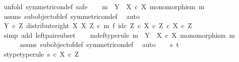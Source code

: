 \begin{isabellebody}
%
\isadelimproof
%
\endisadelimproof
%
\isatagproof
{}\isamarkupfalse%
\ {\isacharparenleft}{\kern0pt}unfold\ symmetric{\isacharunderscore}{\kern0pt}on{\isacharunderscore}{\kern0pt}def{\isacharcomma}{\kern0pt}\ safe{\isacharparenright}{\kern0pt}\isanewline
\ \ \isamarkupfalse%
\ {\isachardoublequoteopen}m\ {\isacharcolon}{\kern0pt}\ Y\ {\isasymrightarrow}\ X\ {\isasymtimes}\isactrlsub c\ X{\isachardoublequoteclose}\ {\isachardoublequoteopen}monomorphism\ m{\isachardoublequoteclose}\isanewline
\ \ \ \ \isamarkupfalse%
\ assms\ subobject{\isacharunderscore}{\kern0pt}of{\isacharunderscore}{\kern0pt}def{}\ symmetric{\isacharunderscore}{\kern0pt}on{\isacharunderscore}{\kern0pt}def\ \isamarkupfalse%
\ auto\isanewline
\ \ \isamarkupfalse%
\ \isamarkupfalse%
\ {\isachardoublequoteopen}{\isacharparenleft}{\kern0pt}Y\ {\isasymtimes}\isactrlsub c\ Z{\isacharcomma}{\kern0pt}\ distribute{\isacharunderscore}{\kern0pt}right\ X\ X\ Z\ {\isasymcirc}\isactrlsub c\ m\ {\isasymtimes}\isactrlsub f\ id\isactrlsub c\ Z{\isacharparenright}{\kern0pt}\ {\isasymsubseteq}\isactrlsub c\ {\isacharparenleft}{\kern0pt}X\ {\isasymtimes}\isactrlsub c\ Z{\isacharparenright}{\kern0pt}\ {\isasymtimes}\isactrlsub c\ X\ {\isasymtimes}\isactrlsub c\ Z{\isachardoublequoteclose}\isanewline
\ \ \ \ \isamarkupfalse%
\ {\isacharparenleft}{\kern0pt}simp\ add{\isacharcolon}{\kern0pt}\ left{\isacharunderscore}{\kern0pt}pair{\isacharunderscore}{\kern0pt}subset{\isacharparenright}{\kern0pt}\isanewline
{}\isamarkupfalse%
\isanewline
\ \ \isamarkupfalse%
\ m{\isacharunderscore}{\kern0pt}def{\isacharbrackleft}{\kern0pt}type{\isacharunderscore}{\kern0pt}rule{\isacharbrackright}{\kern0pt}{\isacharcolon}{\kern0pt}\ {\isachardoublequoteopen}m\ {\isacharcolon}{\kern0pt}\ Y\ {\isasymrightarrow}\ X\ {\isasymtimes}\isactrlsub c\ X{\isachardoublequoteclose}\ {\isachardoublequoteopen}monomorphism\ m{\isachardoublequoteclose}\isanewline
\ \ \ \ \isamarkupfalse%
\ assms\ subobject{\isacharunderscore}{\kern0pt}of{\isacharunderscore}{\kern0pt}def{}\ symmetric{\isacharunderscore}{\kern0pt}on{\isacharunderscore}{\kern0pt}def\ \isamarkupfalse%
\ auto\isanewline
\ \ \isamarkupfalse%
\ s\ t\ \isanewline
\ \ \isamarkupfalse%
\ s{\isacharunderscore}{\kern0pt}type{\isacharbrackleft}{\kern0pt}type{\isacharunderscore}{\kern0pt}rule{\isacharbrackright}{\kern0pt}{\isacharcolon}{\kern0pt}\ {\isachardoublequoteopen}s\ {\isasymin}\isactrlsub c\ X\ {\isasymtimes}\isactrlsub c\ Z{\isachardoublequoteclose}\isanewline

\end{isabellebody}
